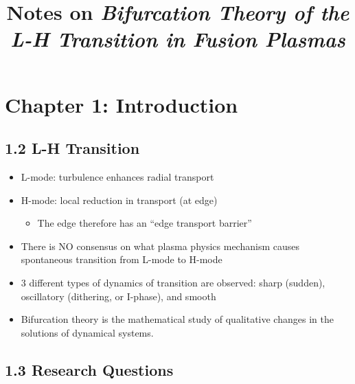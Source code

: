 \documentclass[a4paper]{article}
\title{Notes on \emph{Bifurcation Theory of the L-H Transition in Fusion Plasmas}}
\author{}
\date{}
\begin{document}
\maketitle

\section{Chapter 1: Introduction}\label{chapter-1-introduction}

\subsection{1.2 L-H Transition}\label{l-h-transition}

\begin{itemize}
\item
  L-mode: turbulence enhances radial transport
\item
  H-mode: local reduction in transport (at edge)

  \begin{itemize}
  \itemsep1pt\parskip0pt
  \item
    The edge therefore has an ``edge transport barrier''
  \end{itemize}
\item
  There is NO consensus on what plasma physics mechanism causes
  spontaneous transition from L-mode to H-mode
\item
  3 different types of dynamics of transition are observed: sharp
  (sudden), oscillatory (dithering, or I-phase), and smooth
\item
  Bifurcation theory is the mathematical study of qualitative changes in
  the solutions of dynamical systems.
\end{itemize}

\subsection{1.3 Research Questions}\label{research-questions}
\end{document}
